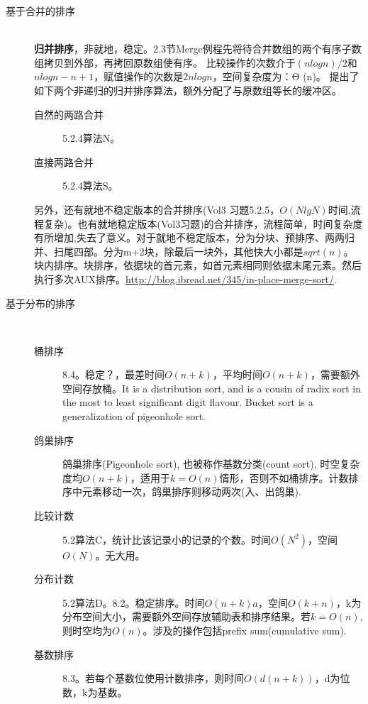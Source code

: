 \begin{description}
\begin{description}
	\end{description}
    \item[基于合并的排序] 
        \hfill \\
	\textbf{归并排序}，非就地，稳定。\cite{ita}2.3节Merge例程先将待合并数组的两个有序子数组拷贝到外部，再拷回原数组使有序。
	比较操作的次数介于$(nlogn)/2$和$nlogn-n+1$，赋值操作的次数是$2nlogn$，空间复杂度为：Θ (n)\cite{weijipedia}。
	\cite{acp}提出了如下两个非递归的归并排序算法，额外分配了与原数组等长的缓冲区。
	\begin{description}
	    \item[自然的两路合并]\cite{acp}5.2.4算法N。
	    \item[直接两路合并]\cite{acp}5.2.4算法S。
	\end{description}
	另外，还有就地不稳定版本的合并排序(\cite{acp}Vol3 习题5.2.5，$O(NlgN)$时间,流程复杂)。也有就地稳定版本(\cite{acp}Vol3习题)的合并排序，流程简单，时间复杂度有所增加,失去了意义。对于就地不稳定版本，分为分块、预排序、两两归并、扫尾四部。分为m+2块，除最后一块外，其他快大小都是$sqrt(n)$。块内排序。块排序，依据块的首元素，如首元素相同则依据末尾元素。然后执行多次AUX排序。\url{http://blog.ibread.net/345/in-place-merge-sort/}.
    \item[基于分布的排序] \hfill \\

	\begin{description}
	    \item[桶排序]\cite{ita}8.4。稳定？，最差时间$O(n+k)$，平均时间$O(n+k)$，需要额外空间存放桶。It is a distribution sort, and is a cousin of radix sort in the most to least significant digit flavour. Bucket sort is a generalization of pigeonhole sort. 
	    \item[鸽巢排序]鸽巢排序(Pigeonhole sort), 也被称作基数分类\cite{weijipedia}(count sort\cite{wikipedia}), 时空复杂度均$O(n+k)$，适用于$k=O(n)$情形，否则不如桶排序。计数排序中元素移动一次，鸽巢排序则移动两次(入、出鸽巢)\cite{wikipedia}.
	    \item[比较计数]\cite{acp}5.2算法C，统计比该记录小的记录的个数。时间$O(N^2)$，空间$O(N)$。无大用。
	    \item[分布计数]\cite{acp}5.2算法D。\cite{ita}8.2。稳定排序。时间$O(n+k)a$，空间$O(k+n)$，k为分布空间大小，需要额外空间存放辅助表和排序结果。若$k=O(n)$,则时空均为$O(n)$。涉及的操作包括prefix sum(cumulative sum).
	    \item[基数排序]\cite{ita}8.3。若每个基数位使用计数排序，则时间$O(d(n+k))$，d为位数，k为基数。
	\end{description}
\end{description}

